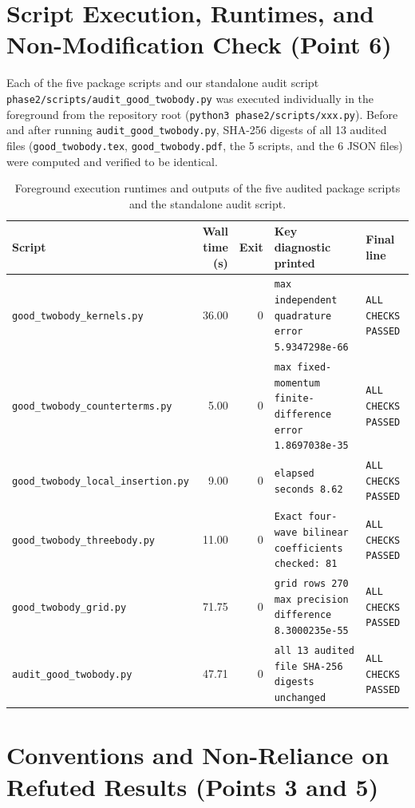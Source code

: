 \documentclass[11pt,a4paper]{article}
\begin{document}
\section{Script Execution, Runtimes, and Non-Modification Check (Point 6)}

Each of the five package scripts and our standalone audit script \texttt{phase2/scripts/audit\_good\_twobody.py} was executed individually in the foreground from the repository root (\texttt{python3 phase2/scripts/xxx.py}). Before and after running \texttt{audit\_good\_twobody.py}, SHA-256 digests of all 13 audited files (\texttt{good\_twobody.tex}, \texttt{good\_twobody.pdf}, the 5 scripts, and the 6 JSON files) were computed and verified to be identical.

\begin{table}[htbp]
\centering
\small
\begin{tabular}{@{}lrrll@{}}
\toprule
\textbf{Script} & \textbf{Wall time (s)} & \textbf{Exit} & \textbf{Key diagnostic printed} & \textbf{Final line} \\
\midrule
\texttt{good\_twobody\_kernels.py} & 36.00 & 0 & \texttt{max independent quadrature error 5.9347298e-66} & \texttt{ALL CHECKS PASSED} \\
\texttt{good\_twobody\_counterterms.py} & 5.00 & 0 & \texttt{max fixed-momentum finite-difference error 1.8697038e-35} & \texttt{ALL CHECKS PASSED} \\
\texttt{good\_twobody\_local\_insertion.py} & 9.00 & 0 & \texttt{elapsed seconds 8.62} & \texttt{ALL CHECKS PASSED} \\
\texttt{good\_twobody\_threebody.py} & 11.00 & 0 & \texttt{Exact four-wave bilinear coefficients checked: 81} & \texttt{ALL CHECKS PASSED} \\
\texttt{good\_twobody\_grid.py} & 71.75 & 0 & \texttt{grid rows 270 max precision difference 8.3000235e-55} & \texttt{ALL CHECKS PASSED} \\
\midrule
\texttt{audit\_good\_twobody.py} & 47.71 & 0 & \texttt{all 13 audited file SHA-256 digests unchanged} & \texttt{ALL CHECKS PASSED} \\
\bottomrule
\end{tabular}
\caption{Foreground execution runtimes and outputs of the five audited package scripts and the standalone audit script.}
\label{tab:runtimes}
\end{table}

\section{Conventions and Non-Reliance on Refuted Results (Points 3 and 5)}
\end{document}
